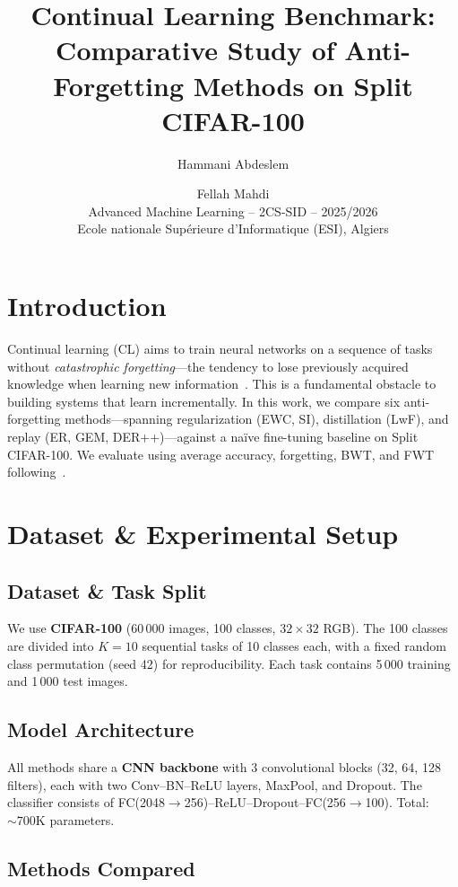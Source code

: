 \documentclass[10pt, a4paper, twocolumn]{article}
\title{\textbf{Continual Learning Benchmark:\\Comparative Study of Anti-Forgetting Methods on Split CIFAR-100}}
\author{
  Hammani Abdeslem \and Fellah Mahdi \\
  \small Advanced Machine Learning -- 2CS-SID -- 2025/2026 \\
  \small Ecole nationale Sup\'erieure d'Informatique (ESI), Algiers
}
\date{}
\begin{document}
\maketitle

\section{Introduction}

Continual learning (CL) aims to train neural networks on a sequence of tasks without \textit{catastrophic forgetting}---the tendency to lose previously acquired knowledge when learning new information~\cite{mccloskey1989catastrophic}.
This is a fundamental obstacle to building systems that learn incrementally.
In this work, we compare six anti-forgetting methods---spanning regularization (EWC, SI), distillation (LwF), and replay (ER, GEM, DER++)---against a na\"ive fine-tuning baseline on Split CIFAR-100.
We evaluate using average accuracy, forgetting, BWT, and FWT following~\cite{lopez2017gradient}.

\section{Dataset \& Experimental Setup}

\subsection{Dataset \& Task Split}

We use \textbf{CIFAR-100} (60\,000 images, 100 classes, $32\!\times\!32$ RGB). The 100 classes are divided into $K\!=\!10$ sequential tasks of 10 classes each, with a fixed random class permutation (seed 42) for reproducibility. Each task contains 5\,000 training and 1\,000 test images.

\subsection{Model Architecture}

All methods share a \textbf{CNN backbone} with 3 convolutional blocks (32, 64, 128 filters), each with two Conv--BN--ReLU layers, MaxPool, and Dropout. The classifier consists of FC(2048$\to$256)--ReLU--Dropout--FC(256$\to$100). Total: $\sim\!700$K parameters.

\subsection{Methods Compared}
\end{document}
